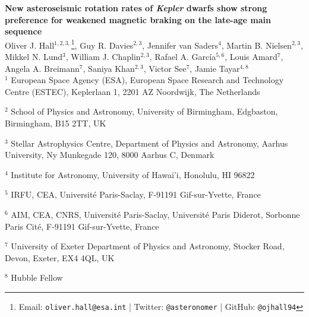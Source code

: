 \documentclass[12pt]{article}
\newcommand{\rtwo}[1]{{#1}}
\renewcommand*{\thefootnote}{\fnsymbol{footnote}}
\begin{document}
\noindent\textbf{\LARGE{New asteroseismic rotation rates of \emph{Kepler} dwarfs show strong \rtwo{preference for} weakened magnetic braking on the late-age main sequence}}\\

\noindent Oliver J. Hall$^{1,2,3,}$\footnote[1]{Email: \texttt{oliver.hall@esa.int} | Twitter: \texttt{@asteronomer} | GitHub: \texttt{@ojhall94}},
	Guy R. Davies$^{2,3}$, 
	Jennifer van Saders$^{4}$,
	Martin B. Nielsen$^{2,3}$,
	Mikkel N. Lund$^{3}$, 
	William J. Chaplin$^{2,3}$, 
	Rafael A. Garc\'ia$^{5, 6}$, 
	Louis Amard$^{7}$,
	Angela A. Breimann$^{7}$, 
	Saniya Khan$^{2,3}$, 
	Victor See$^{7}$, 
	Jamie Tayar$^{4, 8}$
	\\
	
	\noindent $^{1}$ European Space Agency (ESA), European Space Research and Technology Centre (ESTEC), Keplerlaan 1, 2201 AZ Noordwijk, The Netherlands

	\noindent 	$^{2}$ School of Physics and Astronomy, University of Birmingham, Edgbaston, Birmingham, B15 2TT, UK

	\noindent 	$^{3}$ Stellar Astrophysics Centre, Department of Physics and Astronomy, Aarhus University, Ny Munkegade 120, 8000 Aarhus C, Denmark

	\noindent 	$^{4}$ Institute for Astronomy, University of Hawai'i, Honolulu, HI 96822

	\noindent 	$^{5}$ IRFU, CEA, Universit\'e Paris-Saclay, F-91191 Gif-sur-Yvette, France

	\noindent 	$^{6}$ AIM, CEA, CNRS, Universit\'e Paris-Saclay, Universit\'e Paris Diderot, Sorbonne Paris Cit\'e, F-91191 Gif-sur-Yvette, France

	\noindent 	$^{7}$ University of Exeter Department of Physics and Astronomy, Stocker Road, Devon, Exeter, EX4 4QL, UK
	
	\noindent $^{8}$ Hubble Fellow


\vspace{10mm}

\renewcommand*{\thefootnote}{\arabic{footnote}}
\setcounter{footnote}{0}
\end{document}
